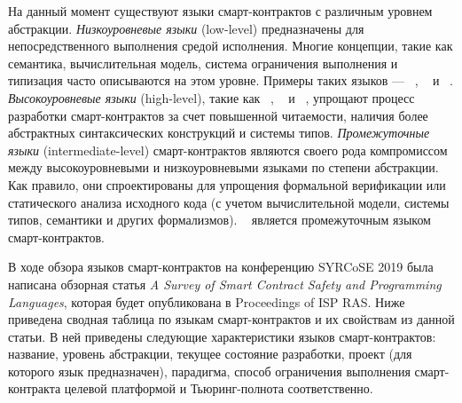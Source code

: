 На данный момент существуют языки смарт-контрактов с различным уровнем абстракции. 
\emph{Низкоуровневые языки} (low-level) предназначены для непосредственного выполнения средой исполнения.
Многие концепции, такие как семантика, вычислительная модель, система ограничения выполнения и типизация часто описываются на этом уровне.
Примеры таких языков --- ~\cite{EthereumYellowPaper}, ~\cite{BitcoinScript} и ~\cite{Michelson}.
\emph{Высокоуровневые языки} (high-level), такие как ~\cite{Solidity}, ~\cite{Flint} и ~\cite{liquidity},
упрощают процесс разработки смарт-контрактов за счет повышенной читаемости, наличия более абстрактных синтаксических конструкций и системы типов.
\emph{Промежуточные языки} (intermediate-level) смарт-контрактов являются своего рода компромиссом между высокоуровневыми и низкоуровневыми языками по степени абстракции.
Как правило, они спроектированы для упрощения формальной верификации или статического анализа исходного кода (с учетом вычислительной модели, системы типов, семантики и других формализмов).
~\cite{Scilla} является промежуточным языком смарт-контрактов.

В ходе обзора языков смарт-контрактов на конференцию SYRCoSE 2019 была написана обзорная статья \emph{A Survey of Smart Contract Safety and Pro\-gram\-ming Languages}, которая будет опубликована в Proceedings of ISP RAS.
Ниже приведена сводная таблица по языкам смарт-кон\-трак\-тов и их свойствам из данной статьи.
В ней приведены следующие характеристики языков смарт-контрактов: название, уровень абстракции, текущее состояние разработки, проект (для которого язык предназначен), парадигма, способ ограничения выполнения смарт-контракта целевой платформой и Тьюринг-полнота соответственно. 


